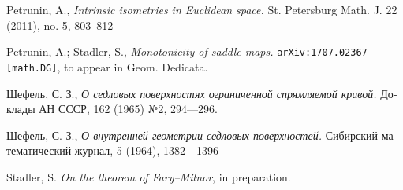 \documentclass{article}
\begin{document}
\begin{thebibliography}{52}
 Petrunin, A.,
\textit{Intrinsic isometries in Euclidean space.}
St. Petersburg Math. J. 22 (2011), no. 5, 803--812 

 Petrunin, A.; Stadler, S.,
\textit{Monotonicity of saddle maps.} 
\texttt{arXiv:1707.02367 [math.DG]}, to appear in Geom. Dedicata.





\begin{otherlanguage}{russian}
Шефель, С. З.,
\textit{О седловых поверхностях ограниченной спрямляемой кривой.}
Доклады АН СССР, 162 (1965) №2, 
294---296.
\end{otherlanguage}

\begin{otherlanguage}{russian}
Шефель, С. З., 
\textit{О внутренней геометрии седловых поверхностей.}
Сибирский математический журнал, 5 (1964), 1382---1396
\end{otherlanguage}


 Stadler, S. \textit{On the theorem of Fary--Milnor}, in preparation.



\end{thebibliography}

\Addresses
\end{document}
